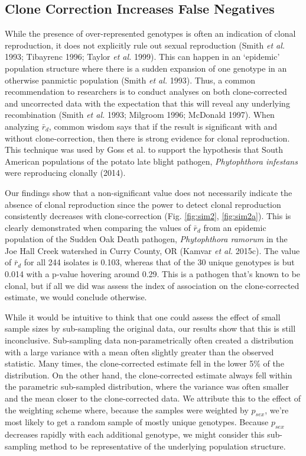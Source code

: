 \documentclass[]{article}
\theoremstyle{definition}
\theoremstyle{definition}
\theoremstyle{remark}
\begin{document}
\subsection{Clone Correction Increases False
Negatives}\label{clone-correction-increases-false-negatives}

While the presence of over-represented genotypes is often an indication
of clonal reproduction, it does not explicitly rule out sexual
reproduction (Smith \emph{et al.} 1993; Tibayrenc 1996; Taylor \emph{et
al.} 1999). This can happen in an `epidemic' population structure where
there is a sudden expansion of one genotype in an otherwise panmictic
population (Smith \emph{et al.} 1993). Thus, a common recommendation to
researchers is to conduct analyses on both clone-corrected and
uncorrected data with the expectation that this will reveal any
underlying recombination (Smith \emph{et al.} 1993; Milgroom 1996;
McDonald 1997). When analyzing \(\bar{r}_d\), common wisdom says that if
the result is significant with and without clone-correction, then there
is strong evidence for clonal reproduction. This technique was used by
Goss et al. to support the hypothesis that South American populations of
the potato late blight pathogen, \emph{Phytophthora infestans} were
reproducing clonally (2014).

Our findings show that a non-significant value does not necessarily
indicate the absence of clonal reproduction since the power to detect
clonal reproduction consistently decreases with clone-correction (Fig.
\ref{fig:sim2}, \ref{fig:sim2a}). This is clearly demonstrated when
comparing the values of \(\bar{r}_d\) from an epidemic population of the
Sudden Oak Death pathogen, \emph{Phytophthora ramorum} in the Joe Hall
Creek watershed in Curry County, OR (Kamvar \emph{et al.} 2015c). The
value of \(\bar{r}_d\) for all 244 isolates is 0.103, whereas that of
the 30 unique genotypes is but 0.014 with a p-value hovering around
0.29. This is a pathogen that's known to be clonal, but if all we did
was assess the index of association on the clone-corrected estimate, we
would conclude otherwise.

While it would be intuitive to think that one could assess the effect of
small sample sizes by sub-sampling the original data, our results show
that this is still inconclusive. Sub-sampling data non-parametrically
often created a distribution with a large variance with a mean often
slightly greater than the observed statistic. Many times, the
clone-corrected estimate fell in the lower 5\% of the distribution. On
the other hand, the clone-corrected estimate always fell within the
parametric sub-sampled distribution, where the variance was often
smaller and the mean closer to the clone-corrected data. We attribute
this to the effect of the weighting scheme where, because the samples
were weighted by \(p_{sex}\), we're most likely to get a random sample
of mostly unique genotypes. Because \(p_{sex}\) decreases rapidly with
each additional genotype, we might consider this sub-sampling method to
be representative of the underlying population structure.
\end{document}
